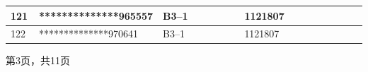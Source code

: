 \documentclass[UTF8,10pt,a4paper,fontset=fandol]{ctexart}
\newcommand{\fieldvalue}[1]{#1}
\begin{document}
\begin{center}
\begin{tabular}{|p{0.08\linewidth}|p{0.30\linewidth}|p{0.25\linewidth}|p{0.22\linewidth}|p{0.15\linewidth}|}
\fieldvalue{121}
&
\fieldvalue{**************965557}
&
\fieldvalue{B3--1}
&
\fieldvalue{1121807}
& \\ \hline
\fieldvalue{122}
&
\fieldvalue{**************970641}
&
\fieldvalue{B3--1}
&
\fieldvalue{1121807}
& \\ \hline
\end{tabular}
\end{center}

\vspace{1em}

\centerline{第3页，共11页}

\newpage
\end{document}
